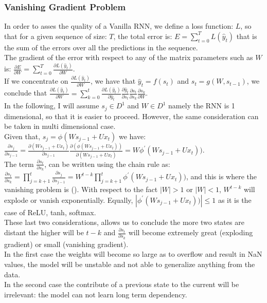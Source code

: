 \documentclass[LaM,binding=0.6cm]{sapthesis}
\begin{document}
\subsubsection{Vanishing Gradient Problem}
In order to asses the quality of a Vanilla RNN, we define a loss function: $L$, so that for a given sequence of size: $T$, the total error is: $E=\sum_{t=0}^{T}L(\hat{y}_t)$ that is the sum of the errors over all the predictions in the sequence.\\The gradient of the error with respect to any of the matrix parameters such as $W$ is: $\frac{\partial E}{\partial W}=\sum_{t=0}^{T}\frac{\partial L(\hat{y}_t)}{\partial W}$.\\If we concentrate on $\frac{\partial L(\hat{y}_t)}{\partial W}$, we have that $\hat{y}_t=f(s_t)$ and $s_t=g(W,s_{t-1})$, we conclude that $\frac{\partial L(\hat{y}_t)}{\partial W} = \sum_{k=0}^t \frac{\partial L(\hat{y}_t)}{\partial \hat{y}_t} \frac{\partial \hat{y}_t}{\partial {s}_t} \frac{\partial s_t}{\partial {s}_k} \frac{\partial s_k}{\partial W} $.\\In the following, I will assume $s_j \in D^1$ and $W \in D^1$ namely the RNN is 1 dimensional, so that it is easier to proceed. However, the same consideration can be taken in multi dimensional case.\\Given that, $s_j=\phi(Ws_{j-1}+Ux_t)$ we have:
$\frac{\partial s_j}{\partial s_{j-1}}= \frac{\partial(Ws_{j-1}+Ux_t)}{\partial s_{j-1}} \frac{\partial(\phi(Ws_{j-1}+Ux_t))}{\partial (Ws_{j-1}+Ux_t)} = W \phi^{'}(Ws_{j-1}+Ux_t))$.\\The term $\frac{\partial s_t}{\partial {s}_k}$, can be written using the chain rule as: $\frac{\partial s_t}{\partial {s}_k}=\prod_{j=k+1}^{t}\frac{\partial s_j}{\partial s_{j-1}}=W^{t-k}\prod_{j=k+1}^{t}\phi^{'}(Ws_{j-1}+Ux_t))$, and this is where the vanishing problem is (\cite{vanprob}). With respect to the fact $|W|>1$ or $|W|<1$, $W^{t-k}$ will explode or vanish exponentially. Equally, $|\phi^{'}(Ws_{j-1}+Ux_t))|\leq1$ as it is the case of ReLU, tanh, softmax.\\These last two considerations, allows us to conclude the more two states are distant the higher will be $t-k$ and $\frac{\partial s_t}{\partial {s}_k}$ will become extremely great (exploding gradient) or small (vanishing gradient).\\In the first case the weights will become so large as to overflow and result in NaN values, the model will be unstable and not able to generalize anything from the data.\\In the second case the contribute of a previous state to the current will be irrelevant: the model can not learn long term dependency.
\end{document}
